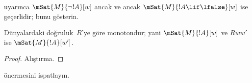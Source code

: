 \begin{prob}
   uyarınca
  $\mSat{M}{\lnot !A}[w]$ ancak ve ancak $\mSat{M}{!A \lif \lfalse}[w]$ ise
  geçerlidir; bunu gösterin.
\end{prob}

\begin{prop}
  Dünyalardaki doğruluk~$R$'ye göre monotondur; yani
  $\mSat{M}{!A}[w]$ ve $Rww'$ ise $\mSat{M}{!A}[w']$.
\end{prop}

\begin{proof}
  Alıştırma.
\end{proof}

\begin{prob}
   önermesini ispatlayın.
\end{prob}


